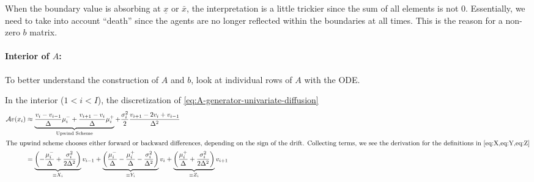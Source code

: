 \documentclass[11pt]{etk-article}
\begin{document}
When the boundary value is absorbing at $\underline{x}$ or $\bar{x}$, the interpretation is a little trickier since the sum of all elements is not $0$.  Essentially, we need to take into account ``death'' since the agents are no longer reflected within the boundaries at all times.  This is the reason for a non-zero $b$ matrix.


\paragraph{Interior of $A$:}
To better understand the construction of $A$ and $b$, look at individual rows of $A$ with the ODE.

In the interior ($1 < i < I$), the discretization of \cref{eq:A-generator-univariate-diffusion}
\begin{align}
\mathcal{A} v(x_i) &\approx \underbrace{\frac{v_i-v_{i-1}}{\Delta}\mu_i^{-}+ \frac{v_{i+1}-v_i}{\Delta}\mu_i^{+}}_{\text{Upwind Scheme}}  + \frac{\sigma_i^2}{2} \frac{v_{i+1} - 2 v_i + v_{i-1}}{\Delta^2}\label{eq:A-generator-univariate-diffusion-interior}\\
\intertext{The upwind scheme chooses either forward or backward differences, depending on the sign of the drift.  Collecting terms, we see the derivation for the definitions in \cref{eq:X,eq:Y,eq:Z}}
&= \underbrace{\left(-\frac{\mu_i^{-}}{\Delta} +\frac{\sigma_i^2}{2\Delta^2}\right)}_{\equiv X_i}v_{i-1} + \underbrace{\left(\frac{\mu_i^{-}}{\Delta} - \frac{\mu_i^{+}}{\Delta}-\frac{\sigma_i^2}{\Delta^2}\right)}_{\equiv Y_i}v_i + \underbrace{\left(\frac{\mu_i^{+}}{\Delta} + \frac{\sigma_i^2}{2\Delta^2}\right)}_{\equiv Z_i}v_{i+1}\label{eq:A-collected-interior}
\end{align}
\end{document}
